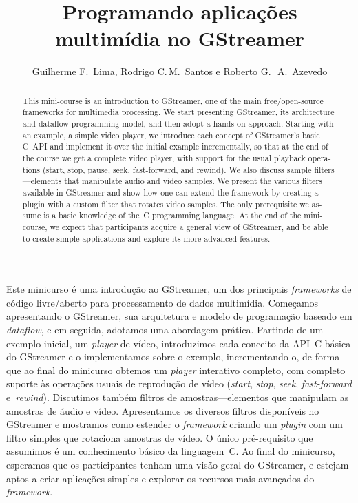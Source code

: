 \documentclass{SBCbookchapter}
\title{Programando aplicações multimídia no GStreamer}
\author{Guilherme F.~Lima, Rodrigo C.\,M.~Santos e Roberto G.\,~A.~Azevedo}
\begin{document}
\maketitle
\begin{abstract}
\begin{otherlanguage}{english}
This mini-course is an introduction to GStreamer, one of the main
free/open-source frameworks for multimedia processing.  We start presenting
GStreamer, its architecture and dataflow programming model, and then adopt a
hands-on approach.  Starting with an example, a simple video player, we
introduce each concept of GStreamer's basic C~API and implement it over the
initial example incrementally, so that at the end of the course we get a
complete video player, with support for the usual playback operations
(start, stop, pause, seek, fast-forward, and rewind).  We also discuss
sample filters---elements that manipulate audio and video samples.  We
present the various filters available in GStreamer and show how one can
extend the framework by creating a plugin with a custom filter that rotates
video samples.  The only prerequisite we assume is a basic knowledge of
the~C programming language.  At the end of the mini-course, we expect that
participants acquire a general view of GStreamer, and be able to create
simple applications and explore its more advanced features.
\end{otherlanguage}
\end{abstract}

\begin{resumo}
Este minicurso é uma introdução ao GStreamer, um dos principais
\emph{frameworks} de código livre/aberto para processamento de dados
multimídia.  Começamos apresentando o GStreamer, sua arquitetura e modelo de
programação baseado em \emph{dataflow}, e em seguida, adotamos uma abordagem
prática.  Partindo de um exemplo inicial, um \emph{player} de vídeo,
introduzimos cada conceito da API~C básica do GStreamer e o implementamos
sobre o exemplo, incrementando-o, de forma que ao final do minicurso obtemos
um \emph{player} interativo completo, com completo suporte às operações
usuais de reprodução de vídeo (\emph{start}, \emph{stop}, \emph{seek},
\emph{fast-forward} e~\emph{rewind}).  Discutimos também filtros de
amostras---elementos que manipulam as amostras de áudio e vídeo.
Apresentamos os diversos filtros disponíveis no GStreamer e mostramos como
estender o \emph{framework} criando um \emph{plugin} com um filtro simples
que rotaciona amostras de vídeo.  O único pré-requisito que assumimos é um
conhecimento básico da linguagem~C.  Ao final do minicurso, esperamos que os
participantes tenham uma visão geral do GStreamer, e estejam aptos a criar
aplicações simples e explorar os recursos mais avançados do
\emph{framework}.
\end{resumo}
\end{document}
